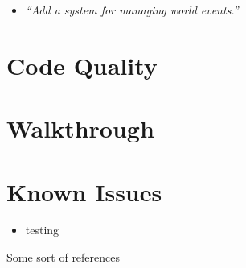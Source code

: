 \documentclass{article}
\begin{document}
\begin{multicols}{2}
\begin{itemize}[leftmargin=*]

                \item \textit{``Add a system for managing world events.''}
                
            \end{itemize}

        \section{Code Quality}

        \section{Walkthrough}

        \section{Known Issues}
        
            \begin{itemize}
                \item testing
            \end{itemize}

    \end{multicols}

    \begin{thebibliography}{9}
        Some sort of references
    \end{thebibliography}        
\end{document}
